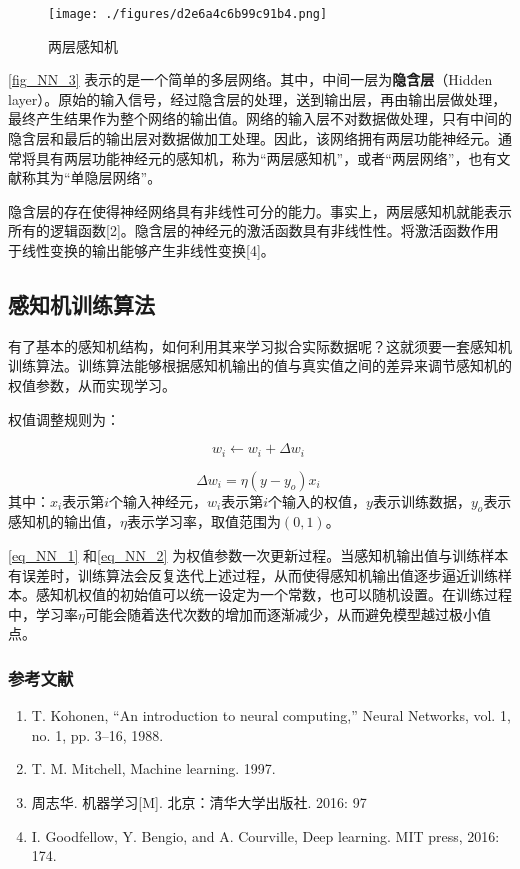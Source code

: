 \begin{figure}[ht]
\centering
\texttt{[image: ./figures/d2e6a4c6b99c91b4.png]}
\caption{两层感知机} \label{fig_NN_3}
\end{figure}
\autoref{fig_NN_3} 表示的是一个简单的多层网络。其中，中间一层为\textbf{隐含层}（Hidden layer）。原始的输入信号，经过隐含层的处理，送到输出层，再由输出层做处理，最终产生结果作为整个网络的输出值。网络的输入层不对数据做处理，只有中间的隐含层和最后的输出层对数据做加工处理。因此，该网络拥有两层功能神经元。通常将具有两层功能神经元的感知机，称为“两层感知机”，或者“两层网络”，也有文献称其为“单隐层网络”。

隐含层的存在使得神经网络具有非线性可分的能力。事实上，两层感知机就能表示所有的逻辑函数[2]。隐含层的神经元的激活函数具有非线性性。将激活函数作用于线性变换的输出能够产生非线性变换[4]。

\subsection{感知机训练算法}

有了基本的感知机结构，如何利用其来学习拟合实际数据呢？这就须要一套感知机训练算法。训练算法能够根据感知机输出的值与真实值之间的差异来调节感知机的权值参数，从而实现学习。

权值调整规则为：

\begin{equation}\label{eq_NN_1}
w_i \leftarrow w_i + \Delta w_i~
\end{equation}

\begin{equation}\label{eq_NN_2}
\Delta w_i = \eta(y-y_o)x_i~
\end{equation}
其中：$x_i$表示第$i$个输入神经元，$w_i$表示第$i$个输入的权值，$y$表示训练数据，$y_o$表示感知机的输出值，$\eta$表示学习率，取值范围为$(0,1)$。

\autoref{eq_NN_1} 和\autoref{eq_NN_2} 为权值参数一次更新过程。当感知机输出值与训练样本有误差时，训练算法会反复迭代上述过程，从而使得感知机输出值逐步逼近训练样本。感知机权值的初始值可以统一设定为一个常数，也可以随机设置。在训练过程中，学习率$\eta$可能会随着迭代次数的增加而逐渐减少，从而避免模型越过极小值点。




\subsubsection{参考文献}
\begin{enumerate}
\item T. Kohonen, “An introduction to neural computing,” Neural Networks, vol. 1, no. 1, pp. 3–16, 1988.
\item T. M. Mitchell, Machine learning. 1997.
\item 周志华. 机器学习[M]. 北京：清华大学出版社. 2016: 97
\item I. Goodfellow, Y. Bengio, and A. Courville, Deep learning. MIT press, 2016: 174.
\end{enumerate}